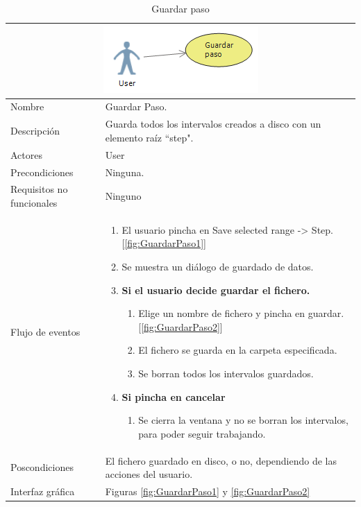 \begin{table}[H]
	\begin{center}
		\begin{tabular}{|l*{1}{p{10cm}}|}
			
			\multicolumn{2}{c}{\includegraphics[width=0.4\linewidth]{./Figures/GuardarPaso.png}} \\
			\hline
		    Nombre                     & Guardar Paso. \\
		    Descripci\'on              & Guarda todos los intervalos creados
		    							 a disco con un elemento ra\'iz ``step".\\ 
		    Actores                    & User  \\
		    Precondiciones             & Ninguna.  \\
		    Requisitos no funcionales  & Ninguno  \\
		    Flujo de eventos           & \begin{enumerate}
		    								\item El usuario pincha en Save selected range -> Step. [\ref{fig:GuardarPaso1}]
		    								\item Se muestra un di\'alogo de guardado de datos.
		    								\item \textbf{Si el usuario decide guardar
		    								el fichero.}
		    								\begin{enumerate}
		    									\item Elige un nombre de fichero y pincha
		    									en guardar. [\ref{fig:GuardarPaso2}]
		    									\item El fichero se guarda en la carpeta
		    									especificada.
		    									\item Se borran todos los intervalos
		    									guardados.
		    								\end{enumerate}
		    								\item \textbf{Si pincha en cancelar}
		    								\begin{enumerate}
		    									\item Se cierra la ventana y no se borran
		    									los intervalos, para poder seguir trabajando.
		    								\end{enumerate}
		    								
		    							 \end{enumerate} \\
		    Poscondiciones			   & El fichero guardado en disco, o no,
		    						     dependiendo de las acciones del usuario.  \\
		    Interfaz gr\'afica		   & Figuras \ref{fig:GuardarPaso1} y \ref{fig:GuardarPaso2}\\
		    \hline
		\end{tabular}
	\caption[Guardar paso]{Guardar paso}
	\label{Guardar paso}
	\end{center}
\end{table}

